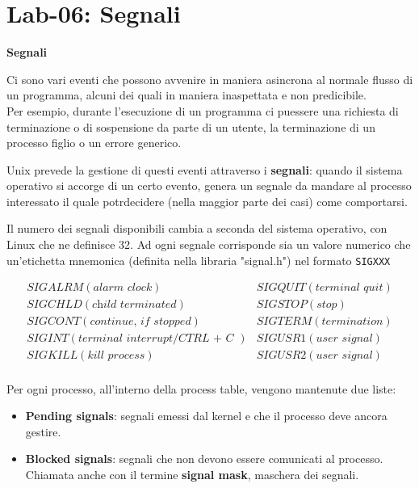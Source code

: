 \section{Lab-06: Segnali}
\begin{flushleft}
  \textbf{Segnali}\par 
  Ci sono vari eventi che possono avvenire in maniera asincrona al normale flusso di un 
  programma, alcuni dei quali in maniera inaspettata e non predicibile. \\ 
  Per esempio, durante l'esecuzione di un programma ci pu\aco essere una richiesta di terminazione o 
  di sospensione da parte di un utente, la terminazione di un processo figlio o un errore 
  generico.\par 
  Unix prevede la gestione di questi eventi attraverso i \textbf{segnali}: quando il sistema 
  operativo si accorge di un certo evento, genera un segnale da mandare al processo 
  interessato il quale potr\aca decidere (nella maggior parte dei casi) come comportarsi.\par
  Il numero dei segnali disponibili cambia a seconda del sistema operativo, con Linux 
  che ne definisce 32. Ad ogni segnale corrisponde sia un valore numerico che 
  un’etichetta mnemonica (definita nella libraria "signal.h") nel formato \texttt{SIGXXX}
  \begin{center}
    $$\begin{array}{l|l}
      SIGALRM (\textit{alarm clock}) & SIGQUIT (\textit{terminal quit})\\
      SIGCHLD (\textit{child terminated}) & SIGSTOP (\textit{stop})\\
      SIGCONT (\textit{continue, if stopped}) & SIGTERM (\textit{termination}) \\
      SIGINT (\textit{terminal interrupt/CTRL + C }) & SIGUSR1 (\textit{user signal}) \\
      SIGKILL (\textit{kill process}) & SIGUSR2 (\textit{user signal}) \\
    \end{array}$$
  \end{center}
  Per ogni processo, all'interno della process table, vengono mantenute due liste:
  \begin{itemize}
    \item \textbf{Pending signals}: segnali emessi dal kernel e che il processo deve ancora gestire.
    \item \textbf{Blocked signals}: segnali che non devono essere comunicati al processo. 
          Chiamata anche con il termine \textbf{signal mask}, maschera dei segnali.

\end{itemize}
\end{flushleft}
